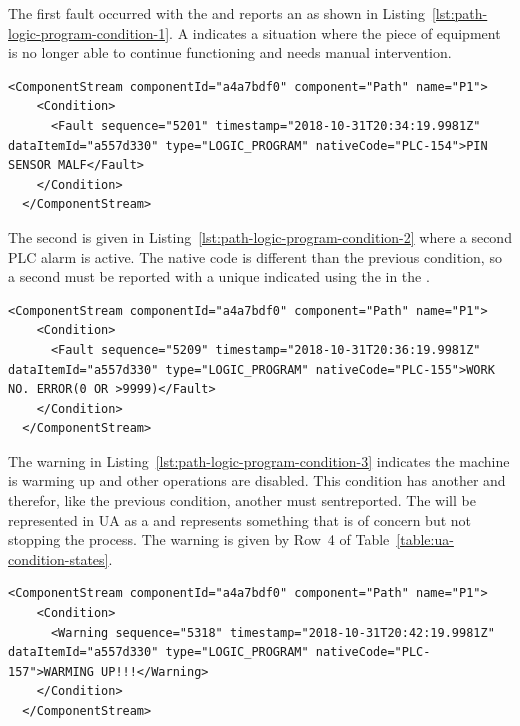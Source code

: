 The first fault occurred with the   and reports an   as shown in Listing~\ref{lst:path-logic-program-condition-1}. A  indicates a situation where the piece of equipment is no longer able to continue functioning and needs manual intervention.

\begin{lstlisting}[firstnumber=last,escapechar=|,%
    caption={Path Logic Program First Fault PLC-154},label={lst:path-logic-program-condition-1}]
  <ComponentStream componentId="a4a7bdf0" component="Path" name="P1">
    <Condition>
      <Fault sequence="5201" timestamp="2018-10-31T20:34:19.9981Z" dataItemId="a557d330" type="LOGIC_PROGRAM" nativeCode="PLC-154">PIN SENSOR MALF</Fault>
    </Condition>
  </ComponentStream>
\end{lstlisting}

The second  is given in Listing~\ref{lst:path-logic-program-condition-2} where a second PLC alarm is active. The native code is different than the previous condition, so a second  must be reported with a unique  indicated using the  in the . 

\begin{lstlisting}[firstnumber=last,escapechar=|,%
    caption={Path Logic Program Second Fault PLC-155},label={lst:path-logic-program-condition-2}]
  <ComponentStream componentId="a4a7bdf0" component="Path" name="P1">
    <Condition>
      <Fault sequence="5209" timestamp="2018-10-31T20:36:19.9981Z" dataItemId="a557d330" type="LOGIC_PROGRAM" nativeCode="PLC-155">WORK NO. ERROR(0 OR >9999)</Fault>
    </Condition>
  </ComponentStream>
\end{lstlisting}

The warning in Listing~\ref{lst:path-logic-program-condition-3} indicates the machine is warming up and other operations are disabled. This condition has another  and therefor, like the previous condition, another  must sentreported. The  will be represented in UA as a  and represents something that is of concern but not stopping the process. The warning is given by Row~4 of Table~\ref{table:ua-condition-states}.

\begin{lstlisting}[firstnumber=last,escapechar=|,%
    caption={Path Logic Program Warning PLC-157},label={lst:path-logic-program-condition-3}]
  <ComponentStream componentId="a4a7bdf0" component="Path" name="P1">
    <Condition>
      <Warning sequence="5318" timestamp="2018-10-31T20:42:19.9981Z" dataItemId="a557d330" type="LOGIC_PROGRAM" nativeCode="PLC-157">WARMING UP!!!</Warning>
    </Condition>
  </ComponentStream>
\end{lstlisting}

